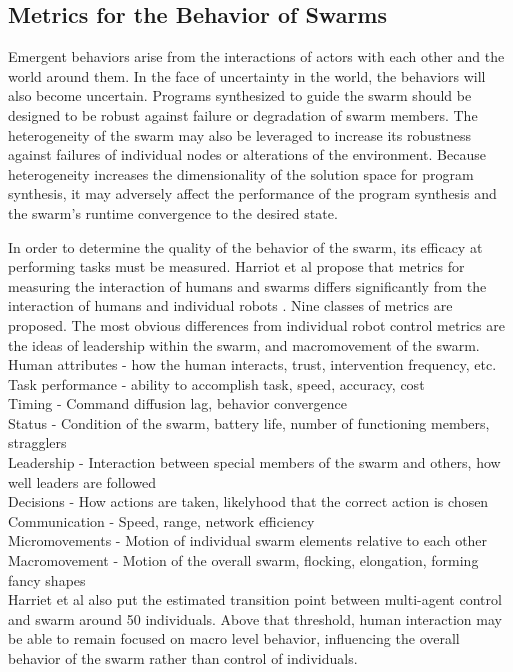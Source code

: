\documentclass[]{article}
\begin{document}
\subsection{Metrics for the Behavior of Swarms}

Emergent behaviors arise from the interactions of actors with each other and the world around them. 
In the face of uncertainty in the world, the behaviors will also become uncertain. 
Programs synthesized to guide the swarm should be designed to be robust against failure or degradation of swarm members. 
The heterogeneity of the swarm may also be leveraged to increase its robustness against failures of individual nodes or alterations of the environment. 
Because heterogeneity increases the dimensionality of the solution space for program synthesis, it may adversely affect the performance of the program synthesis and the swarm's runtime convergence to the desired state.

In order to determine the quality of the behavior of the swarm, its efficacy at performing tasks must be measured. 
Harriot et al propose that metrics for measuring the interaction of humans and swarms differs significantly from the interaction of humans and individual robots \cite{harriott2014biologically}.
Nine classes of metrics are proposed. 
The most obvious differences from individual robot control metrics are the ideas of leadership within the swarm, and macromovement of the swarm. 
Human attributes - how the human interacts, trust, intervention frequency, etc. \\
Task performance - ability to accomplish task, speed, accuracy, cost \\
Timing - Command diffusion lag, behavior convergence \\
Status - Condition of the swarm, battery life, number of functioning members, stragglers \\
Leadership - Interaction between special members of the swarm and others, how well leaders are followed \\
Decisions - How actions are taken, likelyhood that the correct action is chosen \\
Communication - Speed, range, network efficiency \\
Micromovements - Motion of individual swarm elements relative to each other \\
Macromovement - Motion of the overall swarm, flocking, elongation, forming fancy shapes \\ 
Harriet et al also put the estimated transition point between multi-agent control and swarm around 50 individuals. 
Above that threshold, human interaction may be able to remain focused on macro level behavior, influencing the overall behavior of the swarm rather than control of individuals. 
\end{document}
